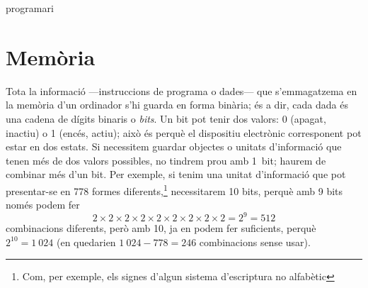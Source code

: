 \begin{persabermes}{programari}

\end{persabermes}


\section{Memòria}
\label{ss:memoria}

Tota la informació ---instruccions de programa o dades--- que
s'emmagatzema en la memòria d'un ordinador s'hi guarda en forma
binària; és a dir, cada dada és una cadena de dígits binaris o
\emph{bits}. Un bit pot tenir dos valors: 0 (apagat, inactiu) o 1
(encés, actiu); això és perquè el dispositiu electrònic corresponent
pot estar en dos estats. Si necessitem guardar objectes o unitats
d'informació que tenen més de dos valors possibles, no tindrem prou
amb 1~bit; haurem de combinar més d'un bit. Per exemple, si tenim una
unitat d'informació que pot presentar-se en 778 formes
diferents,\footnote{Com, per exemple, els signes d'algun sistema
  d'escriptura no alfabètic} necessitarem 10 bits, perquè amb 9 bits
només podem fer $$2 \times 2 \times 2 \times 2 \times 2 \times 2
\times 2 \times 2 \times 2 = 2^9 = 512$$ combinacions diferents, però
amb 10, ja en podem fer suficients, perquè $2^{10}=1~024$ (en
quedarien $1~024-778=246$ combinacions sense usar).

